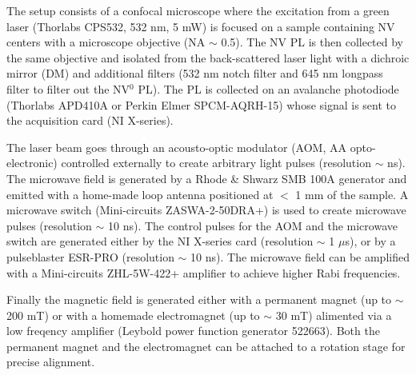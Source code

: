 \documentclass[a4paper, 11pt]{report}
\begin{document}
The setup consists of a confocal microscope where the excitation from a green laser (Thorlabs CPS532, 532 nm, 5 mW) is focused on a sample containing NV centers with a microscope objective (NA $\sim$ 0.5). The NV PL is then collected by the same objective and isolated from the back-scattered laser light with a dichroic mirror (DM) and additional filters (532 nm notch filter and 645 nm longpass filter to filter out the NV$^0$ PL). The PL is collected on an avalanche photodiode (Thorlabs APD410A or Perkin Elmer SPCM-AQRH-15) whose signal is sent to the acquisition card (NI X-series).

The laser beam goes through an acousto-optic modulator (AOM, AA opto-electronic) controlled externally to create arbitrary light pulses (resolution $\sim$ ns). The microwave field is generated by a Rhode \& Shwarz SMB 100A generator and emitted with a home-made loop antenna positioned at $<$ 1 mm of the sample. A microwave switch (Mini-circuits ZASWA-2-50DRA+) is used to create microwave pulses (resolution $\sim$ 10 ns). The control pulses for the AOM and the microwave switch are generated either by the NI X-series card (resolution $\sim$ 1 $\mu$s), or by a pulseblaster ESR-PRO (resolution $\sim$ 10 ns). The microwave field can be amplified with a Mini-circuits ZHL-5W-422+ amplifier to achieve higher Rabi frequencies. 

Finally the magnetic field is generated either with a permanent magnet (up to $\sim$ 200 mT) or with a homemade electromagnet (up to $\sim$ 30 mT) alimented via a low freqency amplifier (Leybold power function generator 522663). Both the permanent magnet and the electromagnet can be attached to a rotation stage for precise alignment.
\end{document}
